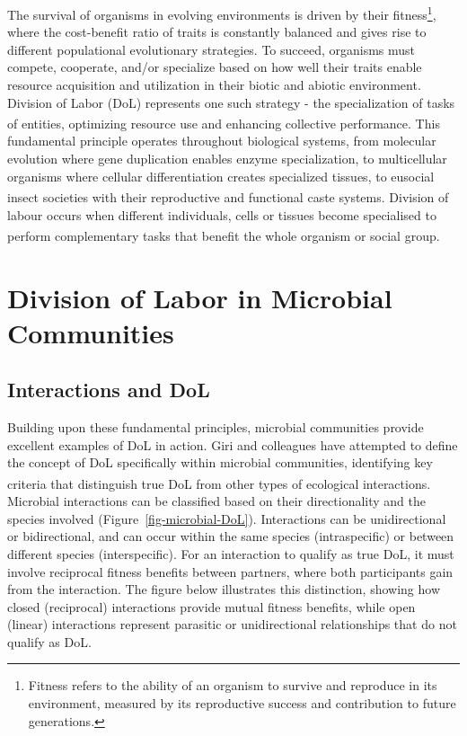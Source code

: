 \documentclass[
  11pt,
  a4paper,
]{report}
\begin{document}
The survival of organisms in evolving environments is driven by their
fitness\footnote{Fitness refers to the ability of an organism to survive
  and reproduce in its environment, measured by its reproductive success
  and contribution to future generations.}, where the cost-benefit ratio
of traits is constantly balanced and gives rise to different
populational evolutionary strategies. To succeed, organisms must
compete, cooperate, and/or specialize based on how well their traits
enable resource acquisition and utilization in their biotic and abiotic
environment. Division of Labor (DoL) represents one such strategy - the
specialization of tasks of entities, optimizing resource use and
enhancing collective
performance\textsuperscript{}. This
fundamental principle operates throughout biological systems, from
molecular evolution where gene duplication enables enzyme
specialization, to multicellular organisms where cellular
differentiation creates specialized tissues, to eusocial insect
societies with their reproductive and functional caste
systems\textsuperscript{}. Division of labour
occurs when different individuals, cells or tissues become specialised
to perform complementary tasks that benefit the whole organism or social
group\textsuperscript{}.

\section{Division of Labor in Microbial
Communities}\label{division-of-labor-in-microbial-communities}

\subsection{Interactions and DoL}\label{interactions-and-dol}

Building upon these fundamental principles, microbial communities
provide excellent examples of DoL in action. Giri and colleagues have
attempted to define the concept of DoL specifically within microbial
communities, identifying key criteria that distinguish true DoL from
other types of ecological
interactions\textsuperscript{}. Microbial
interactions can be classified based on their directionality and the
species involved (Figure~\ref{fig-microbial-DoL}). Interactions can be
unidirectional or bidirectional, and can occur within the same species
(intraspecific) or between different species (interspecific). For an
interaction to qualify as true DoL, it must involve reciprocal fitness
benefits between partners, where both participants gain from the
interaction. The figure below illustrates this distinction, showing how
closed (reciprocal) interactions provide mutual fitness benefits, while
open (linear) interactions represent parasitic or unidirectional
relationships that do not qualify as DoL.
\end{document}
